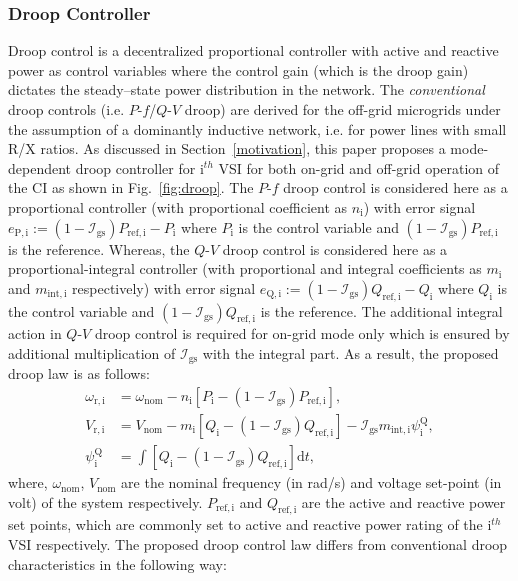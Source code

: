 \documentclass[journal]{IEEEtran}
\begin{document}
\subsubsection{Droop Controller}
Droop control is a decentralized proportional controller with active and reactive power as control variables where the control gain (which is the droop gain) dictates the steady–state power distribution in the network. The \textit{conventional} droop controls (i.e. $P$-$f$/$Q$-$V$ droop) \cite{chandorkar} are derived for the off-grid microgrids under the assumption of a dominantly inductive network, i.e. for power lines with small R/X ratios. As discussed in Section~\ref{motivation}, this paper proposes a mode-dependent droop controller for $\mathrm{i}^{th}$ VSI for both on-grid and off-grid operation of the CI as shown in Fig.~\ref{fig:droop}. The $P$-$f$ droop control is considered here as a proportional controller (with proportional coefficient as $n_\mathrm{i}$) with error signal $e_\mathrm{P,i}:=(1-\mathcal{I}_\mathrm{gs})P_\mathrm{ref,i}-P_\mathrm{i}$ where $P_\mathrm{i}$ is the control variable and $(1-\mathcal{I}_\mathrm{gs})P_\mathrm{ref,i}$ is the reference. Whereas, the $Q$-$V$ droop control is considered here as a proportional-integral controller (with proportional and integral coefficients as $m_\mathrm{i}$ and $m_\mathrm{int,i}$ respectively) with error signal $e_\mathrm{Q,i}:=(1-\mathcal{I}_\mathrm{gs})Q_\mathrm{ref,i}-Q_\mathrm{i}$ where $Q_\mathrm{i}$ is the control variable and $(1-\mathcal{I}_\mathrm{gs})Q_\mathrm{ref,i}$ is the reference. The additional integral action in $Q$-$V$ droop control is required for on-grid mode only which is ensured by additional multiplication of $\mathcal{I}_\mathrm{gs}$ with the integral part. As a result, the proposed droop law is as follows:
\begin{align}
    \omega_\mathrm{r,i} &= \omega_\mathrm{nom} - n_\mathrm{i}[P_\mathrm{i}-(1-\mathcal{I}_\mathrm{gs})P_\mathrm{ref,i}], \label{droop1}\\
    V_\mathrm{r,i} &= V_\mathrm{nom} - m_\mathrm{i}[Q_\mathrm{i}-(1-\mathcal{I}_\mathrm{gs})Q_\mathrm{ref,i}] - \mathcal{I}_\mathrm{gs}m_\mathrm{int,i}\psi^\mathrm{Q}_\mathrm{i},\label{droop2}\\
    \psi^\mathrm{Q}_\mathrm{i} &= \int [Q_\mathrm{i}-(1-\mathcal{I}_\mathrm{gs})Q_\mathrm{ref,i}]\mathrm{d}t,\label{droop3}
\end{align}
where, $\omega_\mathrm{nom}$, $V_\mathrm{nom}$ are the nominal frequency (in rad/s) and voltage set-point (in volt) of the system respectively. $P_\mathrm{ref,i}$ and $Q_\mathrm{ref,i}$ are the active and reactive power set points, which are commonly set to active and reactive power rating of the $\mathrm{i}^{th}$ VSI respectively. The proposed droop control law differs from conventional droop characteristics in the following way:
\end{document}
